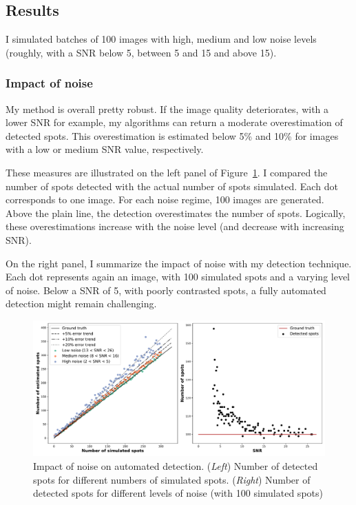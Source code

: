\subsection{Results}
\label{subsec:detection_results}

I simulated batches of 100 images with high, medium and low noise levels (roughly, with a \ac{SNR} below 5, between 5 and 15 and above 15).

\subsubsection{Impact of noise}

My method is overall pretty robust.
If the image quality deteriorates, with a lower \ac{SNR} for example, my algorithms can return a moderate overestimation of detected spots.
This overestimation is estimated below 5\% and 10\% for images with a low or medium \ac{SNR} value, respectively.

These measures are illustrated on the left panel of Figure~\ref{fig:detection_error}.
I compared the number of spots detected with the actual number of spots simulated.
Each dot corresponds to one image.
For each noise regime, 100 images are generated.
Above the plain line, the detection overestimates the number of spots.
Logically, these overestimations increase with the noise level (and decrease with increasing \ac{SNR}).

On the right panel, I summarize the impact of noise with my detection technique.
Each dot represents again an image, with 100 simulated spots and a varying level of noise.
Below a \ac{SNR} of 5, with poorly contrasted spots, a fully automated detection might remain challenging.

\begin{figure}[]
    \centering
    \includegraphics[width=1\textwidth]{figures/chapter2/fused_spot_detection_noise}
    \caption[Impact of noise on automated detection]{Impact of noise on automated detection.
	(\textit{Left}) Number of detected spots for different numbers of simulated spots.
	(\textit{Right}) Number of detected spots for different levels of noise (with 100 simulated spots)}
    \label{fig:detection_error}
\end{figure}

